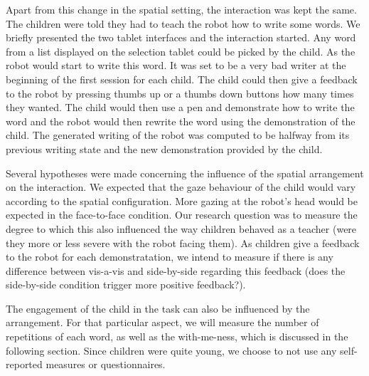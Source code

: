 \documentclass[letterpaper, 10 pt, conference]{ieeeconf}  %
\begin{document}
Apart from this change in the spatial setting, the interaction was kept the same. 
The children were told they had to teach the robot how to write some words. 
We briefly presented the two tablet interfaces and the interaction started.
Any word from a list displayed on the selection tablet could be picked by the child.
As the robot would start to write this word. It was set to be a very bad writer at the beginning of the first session for each child.
The child could then give a feedback to the robot by pressing thumbs up or a thumbs down buttons how many times they wanted.
The child would then use a pen and demonstrate how to write the word and the robot would then rewrite the word using the demonstration of the child.
The generated writing of the robot was computed to be halfway from its previous writing state and the new demonstration provided by the child.

Several hypotheses were made concerning the influence of the spatial arrangement on the interaction.
We expected that the gaze behaviour of the child would vary according to the spatial configuration.
More gazing at the robot's head would be expected in the face-to-face condition.
Our research question was to measure the degree to which this also influenced the way children behaved as a teacher (were they more or less severe with the robot facing them).
As children give a feedback to the robot for each demonstratation, we intend to measure if there is any difference between vis-a-vis and side-by-side regarding this feedback (does the side-by-side condition trigger more positive feedback?).

The engagement of the child in the task can also be influenced by the arrangement.
For that particular aspect, we will measure the number of repetitions of each word, as well as the with-me-ness, which is discussed in the following section.
Since children were quite young, we choose to not use any self-reported measures or questionnaires.
\end{document}
